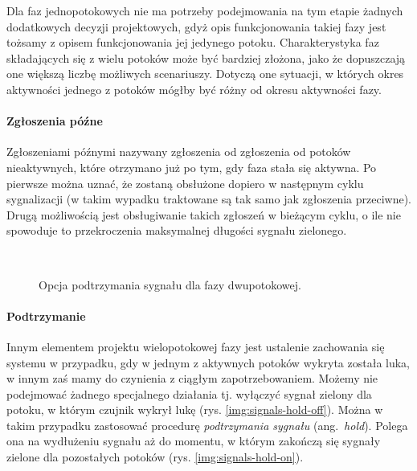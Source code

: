 \documentclass{pracamgr}
\newcommand{\ang}[1]{(ang.~\emph{#1})}
\theoremstyle{plain}
\begin{document}
Dla faz jednopotokowych nie ma potrzeby podejmowania na tym etapie
żadnych dodatkowych decyzji projektowych, gdyż opis funkcjonowania
takiej fazy jest tożsamy z opisem funkcjonowania jej jedynego
potoku. Charakterystyka faz składających się z wielu potoków może być
bardziej złożona, jako że dopuszczają one większą liczbę możliwych
scenariuszy. Dotyczą one sytuacji, w których okres aktywności jednego
z potoków mógłby być różny od okresu aktywności fazy.

\paragraph{Zgłoszenia późne} Zgłoszeniami późnymi nazywany zgłoszenia
od zgłoszenia od potoków nieaktywnych, które otrzymano już po tym, gdy
faza stała się aktywna. Po pierwsze można uznać, że zostaną obsłużone
dopiero w następnym cyklu sygnalizacji (w takim wypadku traktowane są
tak samo jak zgłoszenia przeciwne). Drugą możliwością jest
obsługiwanie takich zgłoszeń w bieżącym cyklu, o ile nie spowoduje to
przekroczenia maksymalnej długości sygnału zielonego.
\begin{figure}[ht]
  \centering
  \\\vspace{0.5cm}
  \caption{Opcja podtrzymania sygnału dla fazy dwupotokowej.}
\end{figure}
\paragraph{Podtrzymanie} Innym elementem projektu wielopotokowej fazy
jest ustalenie zachowania się systemu w przypadku, gdy w jednym z
aktywnych potoków wykryta została luka, w innym zaś mamy do czynienia
z ciągłym zapotrzebowaniem. Możemy nie podejmować żadnego specjalnego
działania tj. wyłączyć sygnał zielony dla potoku, w którym czujnik
wykrył lukę (rys. \ref{img:signals-hold-off}).  Można w takim przypadku
zastosować procedurę \emph{podtrzymania sygnału} \ang{hold}. Polega
ona na wydłużeniu sygnału aż do momentu, w którym zakończą się sygnały
zielone dla pozostałych potoków (rys. \ref{img:signals-hold-on}).
\end{document}
